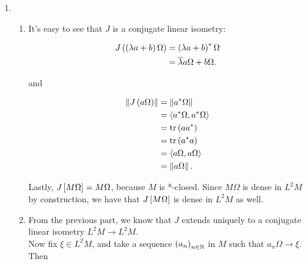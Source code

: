 \documentclass[a4paper,10pt]{report}
\newcommand{\pn}[2]{||#1||_{#2}}
\newcommand{\norm}[1]{||#1||}
\begin{document}
\begin{enumerate}
\begin{enumerate}
\begin{enumerate}
						\begin{proof}
						If $\varphi$ is faithful, then for $x\neq y$, we have 
							\begin{align*}
								\norm{\pi_\varphi(x-y)}^2 &\ge \pn{\pi_\varphi(x-y)\Omega}{\varphi}^2\\
								&= \varphi((x-y)^*(x-y))\\
								& > 0,
							 \end{align*}
							since $(x - y)^*(x- y)$ is a nonzero positive operator.
							Hence, $\pi_\varphi$ is a faithful representation and the claim follows from (2).
							\end{proof}
				\end{enumerate}
		\end{enumerate}
		\setcounter{enumi}{90}
		\newpage
 \item 
		\begin{enumerate}
		\item It's easy to see that $J$ is a conjugate linear isometry: 

                  \begin{align*}
                    J \E \E \lambda a + b \R \Omega \R%
                    &= \E \lambda a + b \R^* \Omega\\
                    &= \ba \lambda a \Omega + b \Omega.
                  \end{align*}

                  and

                  \begin{align*}
                    \NK J \E a \Omega \R \KN%
                    &= \NK a^* \Omega \KN\\
                    &= \ET a^* \Omega , a^* \Omega \TE\\
                    &= \tr \E a a^* \R\\
                    &= \tr \E a^* a \R\\
                    &= \ET a \Omega , a \Omega \TE\\
                    &= \NK a \Omega \KN.
                  \end{align*}

                  Lastly, $J \left[ M \Omega \right] = M \Omega$, because $M$ is *-closed.  Since $M \Omega$ is dense in $L^2 M$ by construction, we have that $J \left[ M \Omega \right]$ is dense in $L^2 M$ as well.
                \item From the previous part, we know that $J$ extends uniquely to a conjugate linear isometry $L^2 M \to L^2 M$.\\
                  Now fix $\xi \in L^2 M$, and take a sequence $\left( a_n \right)_{n \in \mathbb N}$ in $M$ such that $a_n \Omega \to \xi$.  Then 


\end{enumerate}
\end{enumerate}
\end{document}
